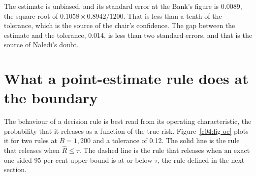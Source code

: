 The estimate is unbiased, and its standard error at the Bank's figure is 0.0089, the
square root of $0.1058 \times 0.8942 / 1200$.
That is less than a tenth of the tolerance, which is the source of the chair's
confidence. The gap between the estimate and the tolerance, 0.014, is less than two
standard errors, and that is the source of Naledi's doubt.

\section{What a point-estimate rule does at the boundary}

The behaviour of a decision rule is best read from its operating characteristic, the
probability that it releases as a function of the true risk. Figure~\ref{c04:fig-oc}
plots it for two rules at $B = 1{,}200$ and a tolerance of 0.12. The solid line is the
rule that releases when $\widehat{R} \le \tau$. The dashed line is the rule that releases
when an exact one-sided 95 per cent upper bound is at or below $\tau$, the rule defined
in the next section.

